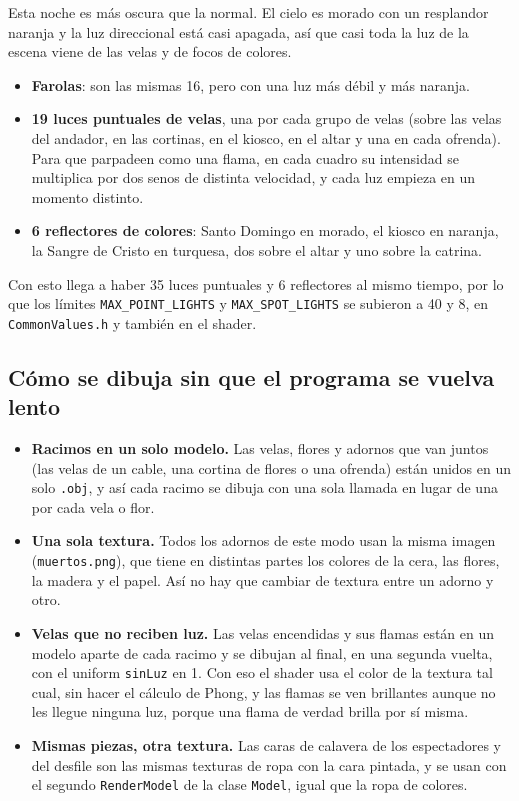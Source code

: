 \documentclass[11pt,a4paper]{article}
\begin{document}
Esta noche es más oscura que la normal. El cielo es morado con un resplandor naranja y la luz direccional está casi apagada, así que casi toda la luz de la escena viene de las velas y de focos de colores.

\begin{itemize}
  \item \textbf{Farolas}: son las mismas 16, pero con una luz más débil y más naranja.
  \item \textbf{19 luces puntuales de velas}, una por cada grupo de velas (sobre las velas del andador, en las cortinas, en el kiosco, en el altar y una en cada ofrenda). Para que parpadeen como una flama, en cada cuadro su intensidad se multiplica por dos senos de distinta velocidad, y cada luz empieza en un momento distinto.
  \item \textbf{6 reflectores de colores}: Santo Domingo en morado, el kiosco en naranja, la Sangre de Cristo en turquesa, dos sobre el altar y uno sobre la catrina.
\end{itemize}

Con esto llega a haber 35 luces puntuales y 6 reflectores al mismo tiempo, por lo que los límites \texttt{MAX\_POINT\_LIGHTS} y \texttt{MAX\_SPOT\_LIGHTS} se subieron a 40 y 8, en \texttt{CommonValues.h} y también en el shader.

\subsection{Cómo se dibuja sin que el programa se vuelva lento}

\begin{itemize}
  \item \textbf{Racimos en un solo modelo.} Las velas, flores y adornos que van juntos (las velas de un cable, una cortina de flores o una ofrenda) están unidos en un solo \texttt{.obj}, y así cada racimo se dibuja con una sola llamada en lugar de una por cada vela o flor.
  \item \textbf{Una sola textura.} Todos los adornos de este modo usan la misma imagen (\texttt{muertos.png}), que tiene en distintas partes los colores de la cera, las flores, la madera y el papel. Así no hay que cambiar de textura entre un adorno y otro.
  \item \textbf{Velas que no reciben luz.} Las velas encendidas y sus flamas están en un modelo aparte de cada racimo y se dibujan al final, en una segunda vuelta, con el uniform \texttt{sinLuz} en 1. Con eso el shader usa el color de la textura tal cual, sin hacer el cálculo de Phong, y las flamas se ven brillantes aunque no les llegue ninguna luz, porque una flama de verdad brilla por sí misma.
  \item \textbf{Mismas piezas, otra textura.} Las caras de calavera de los espectadores y del desfile son las mismas texturas de ropa con la cara pintada, y se usan con el segundo \texttt{RenderModel} de la clase \texttt{Model}, igual que la ropa de colores.
\end{itemize}
\end{document}
